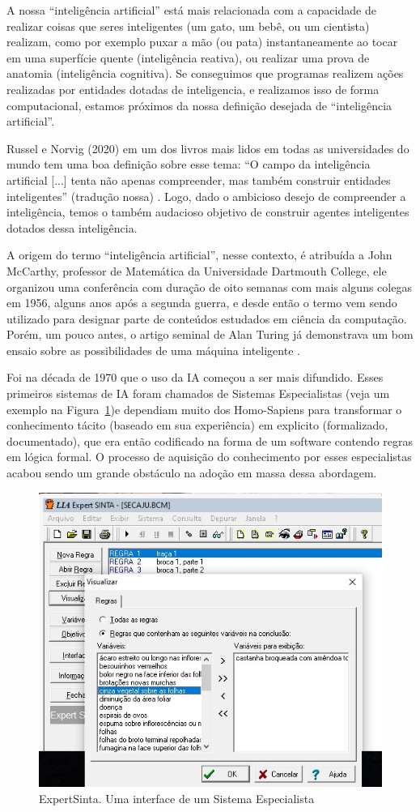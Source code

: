 \documentclass[a4paper,12pt]{book}
\begin{document}
	A nossa ``inteligência artificial'' está mais relacionada com a capacidade de realizar coisas que seres inteligentes (um gato, um bebê, ou um cientista) realizam, como por exemplo puxar a mão (ou pata) instantaneamente ao tocar em uma superfície quente (inteligência reativa), ou realizar uma prova de anatomia (inteligência cognitiva). Se conseguimos que programas realizem ações realizadas por entidades dotadas de inteligencia, e realizamos isso  de forma computacional, estamos próximos da nossa definição desejada de ``inteligência artificial''.
	
	Russel e Norvig (2020) em um dos livros mais lidos em todas as universidades do mundo tem uma boa definição sobre esse tema: ``O campo da inteligência artificial [...] tenta não apenas compreender, mas também construir entidades inteligentes'' (tradução nossa) \cite{norvig2002}. Logo, dado o ambicioso desejo de compreender a inteligência, temos o também audacioso objetivo de construir agentes inteligentes dotados dessa inteligência.
	
	A origem do termo ``inteligência artificial'', nesse contexto, é atribuída a John McCarthy, professor de Matemática da Universidade Dartmouth College\cite{blipblog}, ele organizou uma conferência com duração de oito semanas com mais alguns colegas em 1956, alguns anos após a segunda guerra, e desde então o termo vem sendo utilizado para designar parte de conteúdos estudados em ciência da computação. Porém, um pouco antes, o artigo seminal de Alan Turing já demonstrava um bom ensaio sobre as possibilidades de uma máquina inteligente \cite{Turing1950}.
	
	Foi na década de 1970 que o uso da IA começou a ser mais difundido. Esses primeiros sistemas de IA foram chamados de Sistemas Especialistas (veja um exemplo na Figura~\ref{fig:expert})e dependiam muito dos Homo-Sapiens para transformar o conhecimento tácito (baseado em sua experiência) em explicito (formalizado, documentado), que era então codificado na forma de um software contendo regras em lógica formal. O processo de aquisição do conhecimento por esses especialistas acabou sendo um grande obstáculo na adoção em massa dessa abordagem.
	
	\begin{figure}[h]
		\centering
		\includegraphics[width=0.7\linewidth]{figuras/expert}
		\caption{ExpertSinta. Uma interface de um Sistema Especialista}
		\label{fig:expert}
	\end{figure}
	
\end{document}
